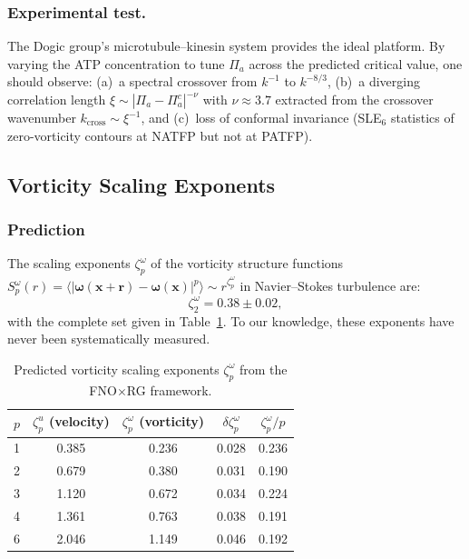 \subsubsection*{Experimental test.}
The Dogic group's microtubule--kinesin system provides the ideal platform. By varying the ATP concentration to tune $\Pi_a$ across the predicted critical value, one should observe: (a)~a spectral crossover from $k^{-1}$ to $k^{-8/3}$, (b)~a diverging correlation length $\xi\sim|\Pi_a-\Pi_a^c|^{-\nu}$ with $\nu\approx 3.7$ extracted from the crossover wavenumber $k_{\mathrm{cross}}\sim\xi^{-1}$, and (c)~loss of conformal invariance (SLE$_6$ statistics of zero-vorticity contours at NATFP but not at PATFP).

\subsection{Vorticity Scaling Exponents\label{subsec:pred_vorticity}}

\subsubsection*{Prediction}
The scaling exponents $\zeta_p^\omega$ of the vorticity structure functions $S_p^\omega(r)=\langle|\boldsymbol{\omega}(\mathbf{x}+\mathbf{r})-\boldsymbol{\omega}(\mathbf{x})|^p\rangle \sim r^{\zeta_p^\omega}$ in Navier--Stokes turbulence are:
\begin{equation}
\boxed{\zeta_2^\omega = 0.38 \pm 0.02,}
\end{equation}
with the complete set given in Table~\ref{tab:vorticity_exponents}. To our knowledge, these exponents have never been systematically measured.

\begin{table}[ht]
\centering
\caption{Predicted vorticity scaling exponents $\zeta_p^\omega$ from the FNO$\times$RG framework.}
\label{tab:vorticity_exponents}
\begin{ruledtabular}
\begin{tabular}{ccccc}
$p$ & $\zeta_p^u$ (velocity) & $\zeta_p^\omega$ (vorticity) & $\delta\zeta_p^\omega$ & $\zeta_p^\omega/p$ \\
\hline
1 & 0.385 & 0.236 & 0.028 & 0.236 \\
2 & 0.679 & 0.380 & 0.031 & 0.190 \\
3 & 1.120 & 0.672 & 0.034 & 0.224 \\
4 & 1.361 & 0.763 & 0.038 & 0.191 \\
6 & 2.046 & 1.149 & 0.046 & 0.192 \\
\end{tabular}
\end{ruledtabular}
\end{table}

